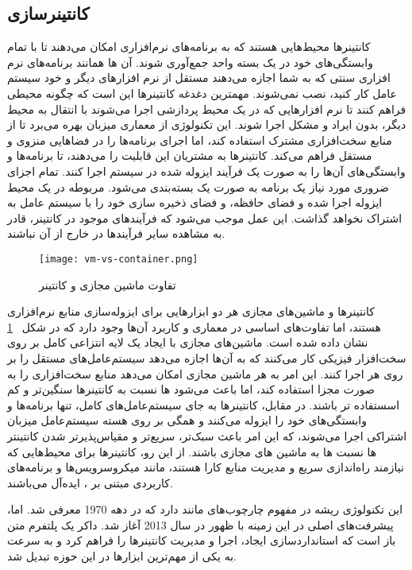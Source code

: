 \subsection{کانتینرسازی}

کانتینرها محیط‌هایی هستند که به برنامه‌های نرم‌افزاری امکان می‌دهند تا با تمام وابستگی‌های خود در یک بسته واحد جمع‌آوری شوند. آن ها همانند برنامه‌های نرم افزاری سنتی که به شما اجازه می‌دهند مستقل از نرم افزارهای دیگر و خود سیستم عامل کار کنید، نصب نمی‌شوند. مهمترین دغدغه کانتینرها این  است که چگونه محیطی فراهم کنند تا نرم افزارهایی که در یک محیط پردازشی اجرا می‌شوند با انتقال به محیط دیگر، بدون ایراد و مشکل اجرا شوند. این تکنولوژی از معماری میزبان بهره می‌برد تا از منابع سخت‌افزاری مشترک استفاده کند، اما اجرای برنامه‌ها را در فضاهایی منزوی و مستقل فراهم می‌کند. کانتینرها به مشتریان این قابلیت را می‌دهند، تا برنامه‌ها و وابستگی‌های آن‌ها را به صورت یک فرآیند ایزوله شده در سیستم اجرا کنند. تمام اجزای ضروری مورد نیاز یک برنامه به صورت یک  بسته‌بندی می‌شود.  مربوطه در یک محیط ایزوله اجرا شده و فضای حافظه،  و فضای ذخیره سازی خود را با سیستم عامل به اشتراک نخواهد گذاشت. این عمل موجب می‌شود که فرآیند‌های موجود در کانتینر، قادر به مشاهده‌ سایر فرآیندها در خارج از آن نباشند.
\begin{figure}[t]
	\centering
	\texttt{[image: vm-vs-container.png]}
	\caption{تفاوت ماشین مجازی و کانتینر}
	\label{fig: vm vs container}
\end{figure}


کانتینرها و ماشین‌های مجازی هر دو ابزارهایی برای ایزوله‌سازی منابع نرم‌افزاری هستند، اما تفاوت‌های اساسی در معماری و کاربرد آن‌ها وجود دارد که در شکل
~\ref{fig: vm vs container}
نشان داده شده است. ماشین‌های مجازی با ایجاد یک لایه انتزاعی کامل بر روی سخت‌افزار فیزیکی کار می‌کنند که به آن‌ها اجازه می‌دهد سیستم‌عامل‌های مستقل را بر روی هر  اجرا کنند. این امر به هر ماشین مجازی امکان می‌دهد منابع سخت‌افزاری را به صورت مجزا استفاده کند، اما باعث می‌شود ‌ها نسبت به کانتینرها سنگین‌تر و کم اسستفاده تر باشند. در مقابل، کانتینرها به جای سیستم‌عامل‌های کامل، تنها برنامه‌ها و وابستگی‌های خود را ایزوله می‌کنند و همگی بر روی هسته سیستم‌عامل میزبان اشتراکی اجرا می‌شوند، که این امر باعث سبک‌تر، سریع‌تر و مقیاس‌پذیرتر شدن کانتینتر ها نسبت ها به ماشین های مجازی باشند. از این رو، کانتینرها برای محیط‌هایی که نیازمند راه‌اندازی سریع و مدیریت منابع کارا هستند، مانند میکروسرویس‌ها و برنامه‌های کاربردی مبتنی بر ، ایده‌آل می‌باشند.


این تکنولوژی ریشه در مفهوم چارچوب‌های  مانند  دارد که در دهه 1970 معرفی شد. اما، پیشرفت‌های اصلی در این زمینه با ظهور  در سال 2013 آغاز شد. داکر یک پلتفرم متن باز است که استاندارد‌سازی ایجاد، اجرا و مدیریت کانتینرها را فراهم کرد و به سرعت به یکی از مهم‌ترین ابزارها در این حوزه تبدیل شد.

